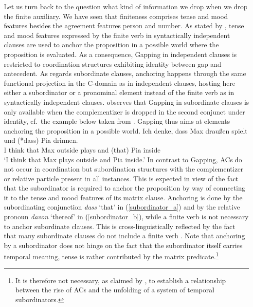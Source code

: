 \documentclass[output=paper,colorlinks,citecolor=brown]{langscibook}
\begin{document}
\z
Let us turn back to the question what kind of information we drop when we drop the finite auxiliary. We have seen that finiteness comprises tense and mood features besides the agreement features person and number. As stated by \citet{repp2009}, tense and mood features expressed by the finite verb in syntactically independent clauses are used to anchor the proposition in a possible world where the proposition is evaluated. As a consequence, Gapping in independent clauses is restricted to coordination structures exhibiting identity between gap and antecedent. As regards subordinate clauses, anchoring happens through the same functional projection in the C-domain as in independent clauses, hosting here either a subordinator or a pronominal element instead of the finite verb as in syntactically independent clauses. \citet{repp2009} observes that Gapping in subordinate clauses is only available when the complementizer is dropped in the second conjunct under identity, cf.\ the example below taken from \citet{repp2009}. Gapping thus aims at elements anchoring the proposition in a possible world. 
\ea \label{gapping_d}
\gll Ich denke, dass Max draußen spielt und (*dass) Pia drinnen. \\ I think that Max outside plays and (that) Pia inside \\
\glt `I think that Max plays outside and Pia inside.'
\z
In contrast to Gapping, ACs do not occur in coordination but subordination structures with the complementizer or relative particle present in all instances. This is expected in view of the fact that the subordinator is required to anchor the proposition by way of connecting it to the tense and mood features of its matrix clause. Anchoring is done by the subordinating conjunction \textit{dass} `that' in (\ref{subordinator_a}) and by the relative pronoun \textit{davon} `thereof' in (\ref{subordinator_b}), while a finite verb is not necessary to anchor subordinate clauses. This is cross-linguistically reflected by the fact that many subordinate clauses do not include a finite verb \citep{repp2009}. Note that anchoring by a subordinator does not hinge on the fact that the subordinator itself carries temporal meaning, tense is rather contributed by the matrix predicate.\footnote{It is therefore not necessary, as claimed by \citet[105]{breitbarth2005}, to establish a relationship between the rise of ACs and the unfolding of a system of temporal subordinators.}
\end{document}

